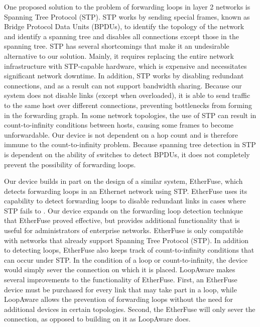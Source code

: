 	One proposed solution to the problem of forwarding loops in layer 2 networks is Spanning Tree Protocol (STP).
	STP works by sending special frames, known as Bridge Protocol Data Units (BPDUs), to identify the topology of the network and identify a spanning tree and disables all connections except those in the spanning tree.
	STP has several shortcomings that make it an undesirable alternative to our solution.
	Mainly, it requires replacing the entire network infrastructure with STP-capable hardware, which is expensive and necessitates significant network downtime.
	In addition, STP works by disabling redundant connections, and as a result can not support bandwidth sharing.
	Because our system does not disable links (except when overloaded), it is able to send traffic to the same host over different connections, preventing bottlenecks from forming in the forwarding graph.
	In some network topologies, the use of STP can result in count-to-infinity conditions between hosts, causing some frames to become unforwardable.
	Our device is not dependent on a hop count and is therefore immune to the count-to-infinity problem.
	Because spanning tree detection in STP is dependent on the ability of switches to detect BPDUs, it does not completely prevent the possibility of forwarding loops.

	Our device builds in part on the design of a similar system, EtherFuse, which detects forwarding loops in an Ethernet network using STP.
	EtherFuse uses its capability to detect forwarding loops to disable redundant links in cases where STP fails to \cite{etherfuse}.
	Our device expands on the forwarding loop detection technique that EtherFuse proved effective, but provides additional functionality that is useful for administrators of enterprise networks.
	EtherFuse is only compatible with networks that already support Spanning Tree Protocol (STP).
	In addition to detecting loops, EtherFuse also keeps track of count-to-infinity conditions that can occur under STP.
	In the condition of a loop or count-to-infinity, the device would simply sever the connection on which it is placed.
	LoopAware makes several improvements to the functionality of EtherFuse.
	First, an EtherFuse device must be purchased for every link that may take part in a loop, while LoopAware allows the prevention of forwarding loops without the need for additional devices in certain topologies.
	Second, the EtherFuse will only sever the connection, as opposed to building on it as LoopAware does.

